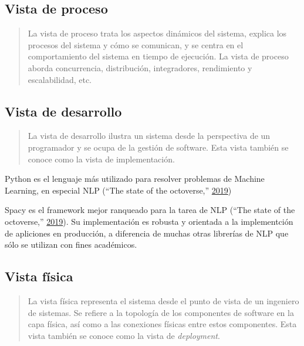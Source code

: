 \documentclass[12pt,a4paper,]{scrartcl}
\begin{document}
\hypertarget{vista-de-proceso}{%
\subsection{Vista de proceso}\label{vista-de-proceso}}

\begin{quote}
La vista de proceso trata los aspectos dinámicos del sistema, explica los procesos del sistema y cómo se comunican, y se centra en el comportamiento del sistema en tiempo de ejecución.
La vista de proceso aborda concurrencia, distribución, integradores, rendimiento y escalabilidad, etc.
\end{quote}

\hypertarget{vista-de-desarrollo}{%
\subsection{Vista de desarrollo}\label{vista-de-desarrollo}}

\begin{quote}
La vista de desarrollo ilustra un sistema desde la perspectiva de un programador y se ocupa de la gestión de software.
Esta vista también se conoce como la vista de implementación.
\end{quote}

Python es el lenguaje más utilizado para resolver problemas de Machine Learning, en especial NLP (``The state of the octoverse,'' \protect\hyperlink{ref-github_machine_learning}{2019})

Spacy es el framework mejor ranqueado para la tarea de NLP (``The state of the octoverse,'' \protect\hyperlink{ref-github_machine_learning}{2019}).
Su implementación es robusta y orientada a la implementción de apliciones en producción, a diferencia de muchas otras librerías de NLP que sólo se utilizan con fines académicos.

\hypertarget{vista-fuxedsica}{%
\subsection{Vista física}\label{vista-fuxedsica}}

\begin{quote}
La vista física representa el sistema desde el punto de vista de un ingeniero de sistemas.
Se refiere a la topología de los componentes de software en la capa física, así como a las conexiones físicas entre estos componentes.
Esta vista también se conoce como la vista de \emph{deployment}.
\end{quote}
\end{document}
